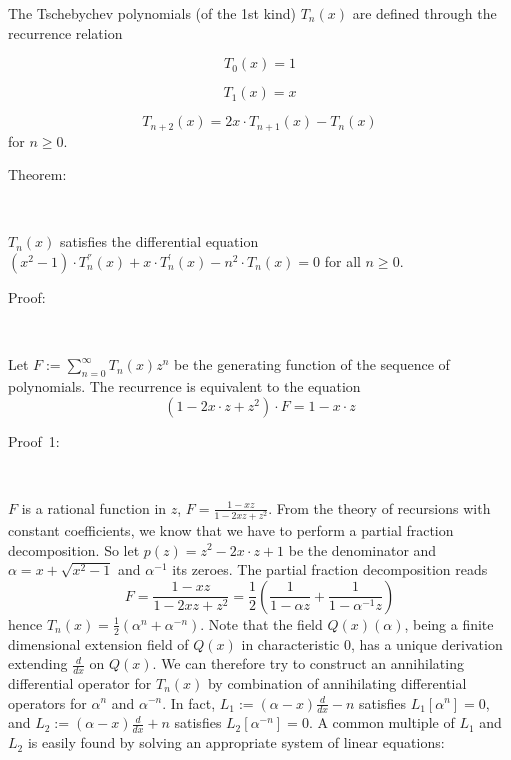\documentclass[12pt,a4paper,oneside,onecolumn]{article}
\begin{document}
The Tschebychev polynomials (of the 1st kind)  \( T_{n}(x) \) are defined through
the recurrence relation


\[
T_{0}(x)=1\]



\[
T_{1}(x)=x\]



\[
T_{n+2}(x)=2x\cdot T_{n+1}(x)-T_{n}(x)\]
 for  \( n\geq 0 \).

\begin{description}

\item [Theorem:]~

\end{description}

 \( T_{n}(x) \) satisfies the differential equation  \( (x^{2}-1)\cdot T_{n}^{''}(x)+x\cdot T_{n}^{'}(x)-n^{2}\cdot T_{n}(x)=0 \) for all  \( n\geq 0 \).

\begin{description}

\item [Proof:]~

\end{description}

Let  \( F:=\sum ^{\infty }_{n=0}T_{n}(x)z^{n} \) be the generating function of the sequence of polynomials. The
recurrence is equivalent to the equation 
\[
(1-2x\cdot z+z^{2})\cdot F=1-x\cdot z\]


\begin{description}

\item [Proof~1:]~

\end{description}

 \( F \) is a rational function in  \( z \),  \( F=\frac{1-xz}{1-2xz+z^{2}} \). From the theory of recursions with
constant coefficients, we know that we have to perform a partial fraction
decomposition. So let  \( p(z)=z^{2}-2x\cdot z+1 \) be the denominator and  \( \alpha =x+\sqrt{x^{2}-1} \) and  \( \alpha ^{-1} \) its zeroes.
The partial fraction decomposition reads 
\[
F=\frac{1-xz}{1-2xz+z^{2}}=\frac{1}{2}\left( \frac{1}{1-\alpha z}+\frac{1}{1-\alpha ^{-1}z}\right) \]
 hence  \( T_{n}(x)=\frac{1}{2}(\alpha ^{n}+\alpha ^{-n}) \). Note that the
field  \( Q(x)(\alpha ) \), being a finite dimensional extension field of  \( Q(x) \) in characteristic
0, has a unique derivation extending  \( \frac{d}{dx} \) on  \( Q(x) \). We can therefore try
to construct an annihilating differential operator for  \( T_{n}(x) \) by combination
of annihilating differential operators for  \( \alpha ^{n} \) and  \( \alpha ^{-n} \). In fact,  \( L_{1}:=(\alpha -x)\frac{d}{dx}-n \) satisfies
 \( L_{1}[\alpha ^{n}]=0 \), and  \( L_{2}:=(\alpha -x)\frac{d}{dx}+n \) satisfies  \( L_{2}[\alpha ^{-n}]=0 \). A common multiple of  \( L_{1} \) and  \( L_{2} \) is easily found
by solving an appropriate system of linear equations:
\end{document}
